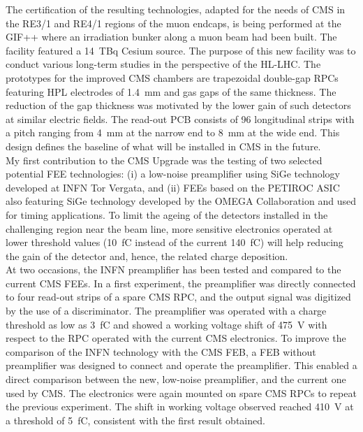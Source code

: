 	The certification of the resulting technologies, adapted for the needs of CMS in the RE3/1 and RE4/1 regions of the muon endcaps, is being performed at the \acf{GIF++} where an irradiation bunker along a muon beam had been built. The facility featured a \SI{14}{TBq} Cesium source. The purpose of this new facility was to conduct various long-term studies in the perspective of the HL-LHC. The prototypes for the improved CMS chambers are trapezoidal double-gap RPCs featuring \acf{HPL} electrodes of \SI{1.4}{mm} and gas gaps of the same thickness. The reduction of the gap thickness was motivated by the lower gain of such detectors at similar electric fields. The read-out PCB consists of 96 longitudinal strips with a pitch ranging from \SI{4}{mm} at the narrow end to \SI{8}{mm} at the wide end. This design defines the baseline of what will be installed in CMS in the future.\\
	My first contribution to the CMS Upgrade was the testing of two selected potential FEE technologies: (i) a low-noise preamplifier using SiGe technology developed at INFN Tor Vergata, and (ii) FEEs based on the PETIROC ASIC also featuring SiGe technology developed by the OMEGA Collaboration and used for timing applications. To limit the ageing of the detectors installed in the challenging region near the beam line, more sensitive electronics operated at lower threshold values (\SI{10}{fC} instead of the current \SI{140}{fC}) will help reducing the gain of the detector and, hence, the related charge deposition.\\
	At two occasions, the INFN preamplifier has been tested and compared to the current CMS FEEs. In a first experiment, the preamplifier was directly connected to four read-out strips of a spare CMS RPC, and the output signal was digitized by the use of a discriminator. The preamplifier was operated with a charge threshold as low as \SI{3}{fC} and showed a working voltage shift of \SI{475}{V} with respect to the RPC operated with the current CMS electronics. To improve the comparison of the INFN technology with the CMS FEB, a FEB without preamplifier was designed to connect and operate the preamplifier. This enabled a direct comparison between the new, low-noise preamplifier, and the current one used by CMS. The electronics were again mounted on spare CMS RPCs to repeat the previous experiment. The shift in working voltage observed reached \SI{410}{V} at a threshold of \SI{5}{fC}, consistent with the first result obtained.\\
